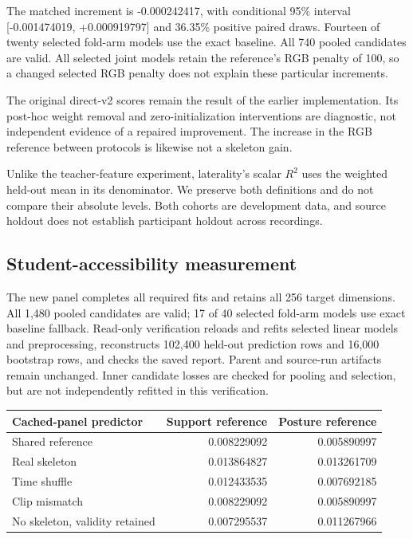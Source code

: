 \documentclass{article}
\begin{document}
The matched increment is -0.000242417, with conditional 95\% interval {[}-0.001474019, +0.000919797{]} and 36.35\% positive paired draws. Fourteen of twenty selected fold-arm models use the exact baseline. All 740 pooled candidates are valid. All selected joint models retain the reference's RGB penalty of 100, so a changed selected RGB penalty does not explain these particular increments.

The original direct-v2 scores remain the result of the earlier implementation. Its post-hoc weight removal and zero-initialization interventions are diagnostic, not independent evidence of a repaired improvement. The increase in the RGB reference between protocols is likewise not a skeleton gain.

Unlike the teacher-feature experiment, laterality's scalar \(R^2\) uses the weighted held-out mean in its denominator. We preserve both definitions and do not compare their absolute levels. Both cohorts are development data, and source holdout does not establish participant holdout across recordings.

\subsection{Student-accessibility measurement}\label{student-accessibility-measurement}

The new panel completes all required fits and retains all 256 target dimensions. All 1,480 pooled candidates are valid; 17 of 40 selected fold-arm models use exact baseline fallback. Read-only verification reloads and refits selected linear models and preprocessing, reconstructs 102,400 held-out prediction rows and 16,000 bootstrap rows, and checks the saved report. Parent and source-run artifacts remain unchanged. Inner candidate losses are checked for pooling and selection, but are not independently refitted in this verification.

{\def\LTcaptype{none} %
\begin{longtable}[]{@{}lrr@{}}
\toprule\noalign{}
Cached-panel predictor & Support reference & Posture reference \\
\midrule\noalign{}
\endhead
\bottomrule\noalign{}
\endlastfoot
Shared reference & 0.008229092 & 0.005890997 \\
Real skeleton & 0.013864827 & 0.013261709 \\
Time shuffle & 0.012433535 & 0.007692185 \\
Clip mismatch & 0.008229092 & 0.005890997 \\
No skeleton, validity retained & 0.007295537 & 0.011267966 \\
\end{longtable}
}
\end{document}
